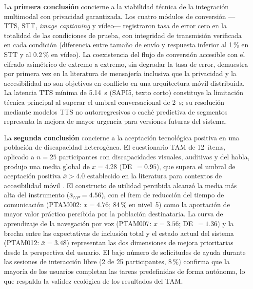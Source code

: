 \documentclass[journal]{IEEEtran}
\begin{document}
		La \textbf{primera conclusi\'on} concierne a la viabilidad t\'ecnica de la integraci\'on multimodal con privacidad garantizada. Los cuatro m\'odulos de conversi\'on ---TTS, STT, \textit{image captioning} y v\'ideo--- registraron tasa de error cero en la totalidad de las condiciones de prueba, con integridad de transmisi\'on verificada en cada condici\'on (diferencia entre tama\~no de env\'io y respuesta inferior al 1\,\% en STT y al 0.2\,\% en v\'ideo). La coexistencia del flujo de conversi\'on accesible con el cifrado asim\'etrico de extremo a extremo, sin degradar la tasa de error, demuestra por primera vez en la literatura de mensajer\'ia inclusiva que la privacidad y la accesibilidad no son objetivos en conflicto en una arquitectura m\'ovil distribuida. La latencia TTS m\'inima de 5.14~s (SAPI5, texto corto) constituye la limitaci\'on t\'ecnica principal al superar el umbral conversacional de 2~s; su resoluci\'on mediante modelos TTS no autorregresivos o cach\'e predictiva de segmentos representa la mejora de mayor urgencia para versiones futuras del sistema.
		
		La \textbf{segunda conclusi\'on} concierne a la aceptaci\'on tecnol\'ogica positiva en una poblaci\'on de discapacidad heterog\'enea. El cuestionario TAM de 12~\'items, aplicado a $n=25$ participantes con discapacidades visuales, auditivas y del habla, produjo una media global de $\bar{x}=4.28$ (DE~$=0.95$), que supera el umbral de aceptaci\'on positiva $\bar{x}>4.0$ establecido en la literatura para contextos de accesibilidad m\'ovil \cite{julianto2023}. El constructo de utilidad percibida alcanz\'o la media m\'as alta del instrumento ($\bar{x}_{UP}=4.56$), con el \'item de reducci\'on del tiempo de comunicaci\'on (PTAM002: $\bar{x}=4.76$; 84\,\% en nivel~5) como la aportaci\'on de mayor valor pr\'actico percibida por la poblaci\'on destinataria. La curva de aprendizaje de la navegaci\'on por voz (PTAM007: $\bar{x}=3.56$; DE~$=1.36$) y la brecha entre las expectativas de inclusi\'on total y el estado actual del sistema (PTAM012: $\bar{x}=3.48$) representan las dos dimensiones de mejora prioritarias desde la perspectiva del usuario. El bajo n\'umero de solicitudes de ayuda durante las sesiones de interacci\'on libre (2 de 25 participantes, 8\,\%) confirma que la mayor\'ia de los usuarios completan las tareas predefinidas de forma aut\'onoma, lo que respalda la validez ecol\'ogica de los resultados del TAM.
		
\end{document}
